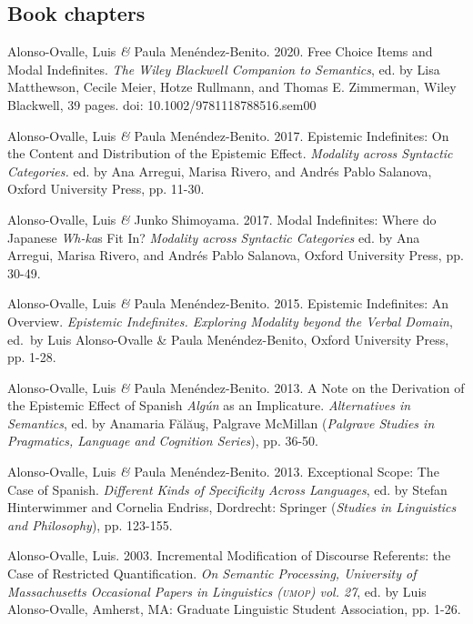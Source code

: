 \documentclass[11pt]{article}
\begin{document}
\subsection*{Book chapters} 

Alonso-Ovalle, Luis \textit{\&} Paula Men\'endez-Benito. 2020. Free Choice Items and Modal Indefinites. \textit{The Wiley Blackwell Companion to Semantics}, ed. by Lisa Matthewson, Cecile Meier, Hotze Rullmann, and Thomas E. Zimmerman, Wiley Blackwell, 39 pages. doi: 10.1002/9781118788516.sem00

Alonso-Ovalle, Luis \textit{\&} Paula Men\'endez-Benito. 2017. Epistemic Indefinites: On the Content and Distribution of the Epistemic Effect. \textit{Modality across Syntactic Categories.} ed. by Ana Arregui, Marisa Rivero, and Andr\'es Pablo Salanova, Oxford University Press, pp. 11-30.

Alonso-Ovalle, Luis \textit{\&} Junko Shimoyama. 2017. Modal Indefinites: Where do Japanese \textit{Wh-ka}s Fit In? \textit{Modality across Syntactic Categories} ed. by Ana Arregui, Marisa Rivero, and Andr\'es Pablo Salanova, Oxford University Press,  pp. 30-49.

Alonso-Ovalle, Luis \textit{\&} Paula Men\'endez-Benito. 2015. Epistemic Indefinites: An Overview. \textit{Epistemic Indefinites. Exploring Modality beyond the Verbal Domain}, ed.\ by Luis Alonso-Ovalle \& Paula Men\'endez-Benito, Oxford University Press, pp. 1-28.

Alonso-Ovalle, Luis \textit{\&} Paula Men\'endez-Benito. 2013. A Note on the Derivation of the Epistemic Effect of Spanish
\textit{Alg\'un} as an Implicature. \textit{Alternatives in Semantics}, ed. by
Anamaria F\u{a}l\u{a}u\c{s}, Palgrave McMillan (\textit{Palgrave
  Studies in Pragmatics, Language and Cognition Series}), pp. 36-50.

Alonso-Ovalle, Luis \textit{\&} Paula Men\'endez-Benito. 2013. Exceptional Scope: The Case of Spanish. \textit{Different Kinds of Specificity Across Languages}, ed. by
Stefan Hinterwimmer and Cornelia Endriss, Dordrecht: Springer
(\textit{Studies in Linguistics and Philosophy}), pp. 123-155.

Alonso-Ovalle, Luis. 2003. Incremental Modification of Discourse Referents: the Case of Restricted Quantification. \textit{On Semantic Processing, University of Massachusetts Occasional Papers in Linguistics (\textsc{umop}) vol. 27}, ed. by Luis Alonso-Ovalle, Amherst, MA: Graduate Linguistic Student Association, pp. 1-26.
\end{document}
